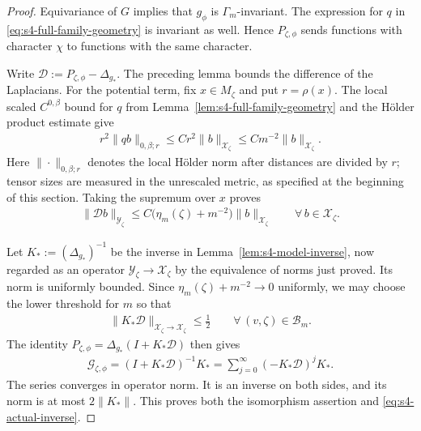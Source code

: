 \documentclass[a4paper,11pt,oneside,reqno]{amsart}
\numberwithin{equation}{section}
\theoremstyle{definition}
\begin{document}
\begin{proof}
    Equivariance of $G$ implies that $g_\phi$ is
    $\Gamma_m$-invariant. The expression for $q$ in
    \eqref{eq:s4-full-family-geometry} is invariant as
    well. Hence $P_{\zeta,\phi}$ sends functions with
    character $\chi$ to functions with the same character.

    Write $\mathcal D:=P_{\zeta,\phi}-\Delta_{g_*}$.
    The preceding lemma bounds the difference of the
    Laplacians. For the potential term, fix $x\in M_\zeta$
    and put $r=\rho(x)$. The local scaled
    $C^{0,\beta}$ bound for $q$ from
    Lemma~\ref{lem:s4-full-family-geometry} and the
    H\"older product estimate give
    \begin{align*}
        r^2\|qb\|_{0,\beta;r}
        \leq Cr^2\|b\|_{\mathcal X_\zeta}
        \leq Cm^{-2}\|b\|_{\mathcal X_\zeta}.
    \end{align*}
    Here $\|\cdot\|_{0,\beta;r}$ denotes the local
    H\"older norm after distances are divided by $r$;
    tensor sizes are measured in the unrescaled metric,
    as specified at the beginning of this section.
    Taking the supremum over $x$ proves
    \begin{align*}
        \|\mathcal D b\|_{\mathcal Y_\zeta}
        \leq C\bigl(\eta_m(\zeta)+m^{-2}\bigr)
        \|b\|_{\mathcal X_\zeta}
        \qquad\forall\,b\in\mathcal X_\zeta.
    \end{align*}

    Let $K_*:=(\Delta_{g_*})^{-1}$ be the inverse in
    Lemma~\ref{lem:s4-model-inverse}, now regarded as an
    operator $\mathcal Y_\zeta\to\mathcal X_\zeta$
    by the equivalence of norms just proved.
    Its norm is uniformly bounded. Since
    $\eta_m(\zeta)+m^{-2}\to0$ uniformly, we may choose
    the lower threshold for $m$ so that
    \begin{align*}
        \|K_*\mathcal D\|_{\mathcal X_\zeta\to\mathcal X_\zeta}
        \leq\frac12
        \qquad\forall\,(v,\zeta)\in\mathcal B_m.
    \end{align*}
    The identity
    $P_{\zeta,\phi}=\Delta_{g_*}(I+K_*\mathcal D)$ then gives
    \begin{align*}
        \mathscr G_{\zeta,\phi}
        =(I+K_*\mathcal D)^{-1}K_*
        =\sum_{j=0}^{\infty}(-K_*\mathcal D)^jK_*.
    \end{align*}
    The series converges in operator norm. It is an
    inverse on both sides, and its norm is at most
    $2\|K_*\|$. This proves both the isomorphism assertion
    and \eqref{eq:s4-actual-inverse}.


\end{proof}
\end{document}
